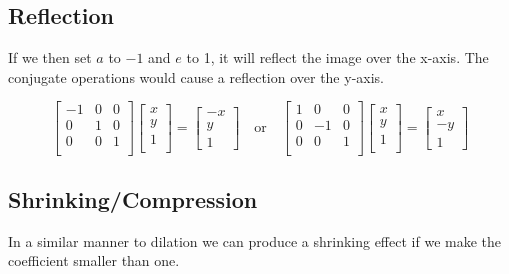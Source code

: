 \documentclass{article}
\begin{document}
\subsection{Reflection} 
If we then set $ a $ to $-1$ and $ e $ to 1, it will reflect the image over 
the x-axis. The conjugate operations would cause a reflection over the y-axis.

\[%
    \begin{bmatrix} 
        -1 & 0 & 0 \\
		0 & 1 & 0 \\
		0 & 0 & 1 \\		
    \end{bmatrix}
    \begin{bmatrix}
        x \\
        y \\
		1 \\		
    \end{bmatrix}
    =
    \begin{bmatrix} - x \\  y \\ 1 \end{bmatrix}
    \quad
    \text{or}
    \quad
    \begin{bmatrix} 
        1 & 0 & 0 \\
		0 & -1 & 0 \\
		0 & 0 & 1 \\		
    \end{bmatrix}
    \begin{bmatrix}
        x \\
        y \\
		1 \\		
    \end{bmatrix}
    =
    \begin{bmatrix} x \\ -y \\ 1 \end{bmatrix}
\]%

\begin{figure}[!htbp]
    \centering
\end{figure}


\clearpage
\subsection{Shrinking/Compression} 

In a similar manner to dilation we can produce a shrinking effect if we make the
coefficient smaller than one.
\end{document}
